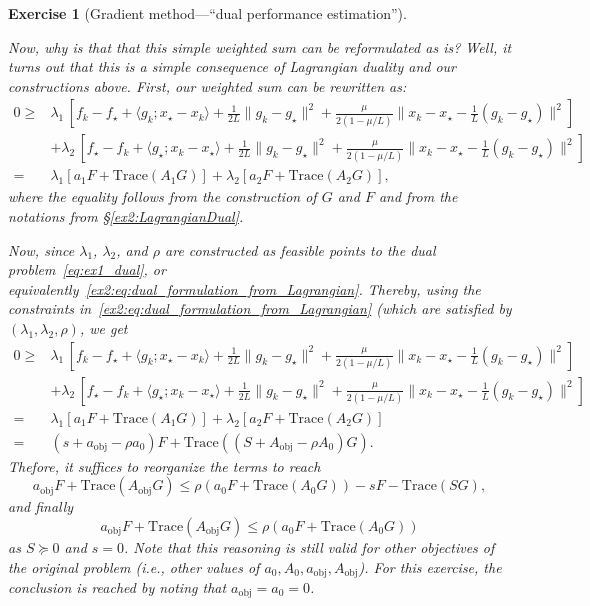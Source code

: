 \documentclass[11pt,a4paper]{article}
\newtheorem{exercise}{Exercise}
\begin{document}
\begin{exercise}[Gradient method---``dual performance estimation'']
\begin{enumerate}
{Now, why is that that this simple weighted sum can be reformulated as is? Well, it turns out that this is a simple consequence of Lagrangian duality and our constructions above. First, our weighted sum can be rewritten as:
\begin{equation*}
\begin{aligned}
0\geqslant &\lambda_1 \, \left[f_k-f_\star+\langle{g_k};{x_\star-x_k}\rangle+\frac{1}{2L}\lVert{g_k-g_\star}\rVert^2+\frac{\mu}{2(1-\mu/L)}\lVert{x_k-x_\star-\frac{{1}}{L}(g_k-g_\star)}\rVert^2\right]\\
&+ \lambda_2 \, \left[f_\star-f_k+\langle{g_\star};{x_k-x_\star}\rangle+\frac{1}{2L}\lVert{g_k-g_\star}\rVert^2+\frac{\mu}{2(1-\mu/L)}\lVert{x_k-x_\star-\frac{{1}}{L}(g_k-g_\star)}\rVert^2\right]\\
=&\lambda_1 \left[ a_1 F +\mathrm{Trace}(A_1 G)\right]+\lambda_2 \left[ a_2 F +\mathrm{Trace}(A_2 G)\right],
\end{aligned}
\end{equation*}
where the equality follows from the construction of $G$ and $F$ and from the notations from  \S\ref{ex2:LagrangianDual}.

Now, since $\lambda_1$, $\lambda_2$, and $\rho$ are constructed as feasible points to the dual problem~\eqref{eq:ex1_dual}, or equivalently~\eqref{ex2:eq:dual_formulation_from_Lagrangian}. Thereby, using the constraints in~\eqref{ex2:eq:dual_formulation_from_Lagrangian} (which are satisfied by $(\lambda_1,\lambda_2,\rho)$, we get
\begin{equation*}
\begin{aligned}
0\geqslant &\lambda_1 \, \left[f_k-f_\star+\langle{g_k};{x_\star-x_k}\rangle+\frac{1}{2L}\lVert{g_k-g_\star}\rVert^2+\frac{\mu}{2(1-\mu/L)}\lVert{x_k-x_\star-\frac{{1}}{L}(g_k-g_\star)}\rVert^2\right]\\
&+ \lambda_2 \, \left[f_\star-f_k+\langle{g_\star};{x_k-x_\star}\rangle+\frac{1}{2L}\lVert{g_k-g_\star}\rVert^2+\frac{\mu}{2(1-\mu/L)}\lVert{x_k-x_\star-\frac{{1}}{L}(g_k-g_\star)}\rVert^2\right]\\
=&\lambda_1 \left[ a_1 F +\mathrm{Trace}(A_1 G)\right]+\lambda_2 \left[ a_2 F +\mathrm{Trace}(A_2 G)\right]\\
=& (s+a_{\text{obj}}-\rho a_0) F +\mathrm{Trace}((S+A_{\text{obj}}-\rho A_0) G).
\end{aligned}
\end{equation*}
Thefore, it suffices to reorganize the terms to reach
\[   a_{\text{obj}}F +\mathrm{Trace}(A_{\text{obj}} G) \leqslant \rho (a_0 F+\mathrm{Trace}(A_0 G))- s F -\mathrm{Trace}(S G),\]
and finally
\[   a_{\text{obj}}F +\mathrm{Trace}(A_{\text{obj}} G) \leqslant \rho (a_0 F+\mathrm{Trace}(A_0 G))\]
as $S\succcurlyeq 0$ and $s=0$. Note that this reasoning is still valid for other objectives of the original problem (i.e., other values of $a_0,A_0,a_{\text{obj}},A_\text{obj}$). For this exercise, the conclusion is reached by noting that $a_\text{obj}=a_0=0$.
	} 
	

\end{enumerate}
\end{exercise}
\end{document}
